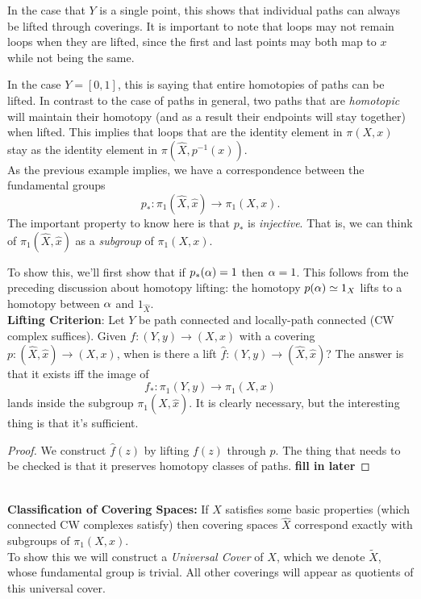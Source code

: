 \documentclass{amsart}
\begin{document}
	 In the case that $Y$ is a single point, this shows that individual paths can always be lifted through coverings. It is important to note that loops may not remain loops when they are lifted, since the first and last points may both map to $x$ while not being the same.
	 
	 In the case $Y=[0,1]$, this is saying that entire homotopies of paths can be lifted. In contrast to the case of paths in general, two paths that are \textit{homotopic} will maintain their homotopy (and as a result their endpoints will stay together) when lifted. This implies that loops that are the identity element in $\pi(X,x)$ stay as the identity element in $\pi(\hat{X},p^{-1}(x))$.\\
	 
	 As the previous example implies, we have a correspondence between the fundamental groups
	 $$
	 p_*: \pi_1(\hat{X},\hat{x}) \to \pi_1(X,x).
	 $$	 
	 The important property to know here is that $p_*$ is \textit{injective}. That is, we can think of $\pi_1(\hat{X},\hat{x})$ as a \textit{subgroup} of $\pi_1(X,x)$.
	 
	 To show this, we'll first show that if $p_*(\alpha)=1$ then $\alpha=1$. This follows from the preceding discussion about homotopy lifting: the homotopy $p(\alpha)\simeq 1_X$ lifts to a homotopy between $\alpha$ and $1_{\hat{X}}$.\\
	 
	 \textbf{Lifting Criterion}: Let $Y$ be path connected and locally-path connected (CW complex suffices). Given $f:(Y,y)\to (X,x)$ with a covering $p:(\hat{X},\hat{x})\to (X,x)$, when is there a lift $\hat{f}:(Y,y)\to (\hat{X},\hat{x})$? The answer is that it exists iff the image of 
	 $$f_*:\pi_1(Y,y)\to \pi_1(X,x)$$
	 lands inside the subgroup $\pi_1(\hat{X},\hat{x})$. It is clearly necessary, but the interesting thing is that it's sufficient.
	 
	 \begin{proof}
	 	We construct $\hat{f}(z)$ by lifting $f(z)$ through $p$. The thing that needs to be checked is that it preserves homotopy classes of paths. \textbf{fill in later} 
	 \end{proof}\\
	 
	 \textbf{Classification of Covering Spaces:} If $X$ satisfies some basic properties (which connected CW complexes satisfy) then covering spaces $\hat{X}$ correspond exactly with subgroups of $\pi_1(X,x)$.\\
	 
	 To show this we will construct a \textit{Universal Cover} of $X$, which we denote $\tilde{X}$, whose fundamental group is trivial. All other coverings will appear as quotients of this universal cover.
	 
\end{document}
